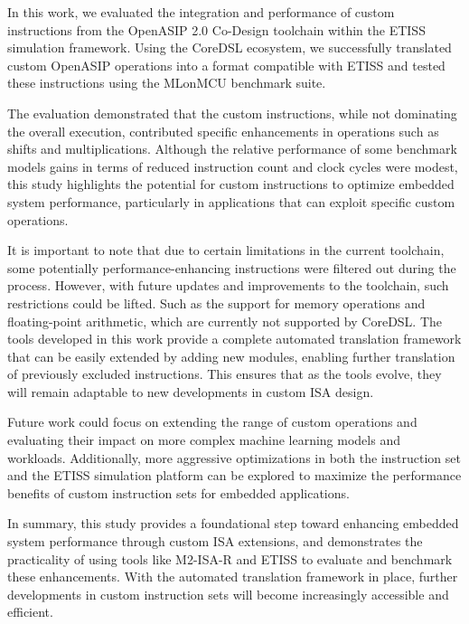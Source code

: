 In this work, we evaluated the integration and performance of custom instructions from the OpenASIP 2.0 Co-Design toolchain within the ETISS simulation framework. Using the CoreDSL ecosystem, we successfully translated custom OpenASIP operations into a format compatible with ETISS and tested these instructions using the MLonMCU benchmark suite.

The evaluation demonstrated that the custom instructions, while not dominating the overall execution, contributed specific enhancements in operations such as shifts and multiplications. Although the relative performance of some benchmark models gains in terms of reduced instruction count and clock cycles were modest, this study highlights the potential for custom instructions to optimize embedded system performance, particularly in applications that can exploit specific custom operations.

It is important to note that due to certain limitations in the current toolchain, some potentially performance-enhancing instructions were filtered out during the process. However, with future updates and improvements to the toolchain, such restrictions could be lifted. Such as the support for memory operations and floating-point arithmetic, which are currently not supported by CoreDSL. The tools developed in this work provide a complete automated translation framework that can be easily extended by adding new modules, enabling further translation of previously excluded instructions. This ensures that as the tools evolve, they will remain adaptable to new developments in custom ISA design.

Future work could focus on extending the range of custom operations and evaluating their impact on more complex machine learning models and workloads. Additionally, more aggressive optimizations in both the instruction set and the ETISS simulation platform can be explored to maximize the performance benefits of custom instruction sets for embedded applications.

In summary, this study provides a foundational step toward enhancing embedded system performance through custom ISA extensions, and demonstrates the practicality of using tools like M2-ISA-R and ETISS to evaluate and benchmark these enhancements. With the automated translation framework in place, further developments in custom instruction sets will become increasingly accessible and efficient.